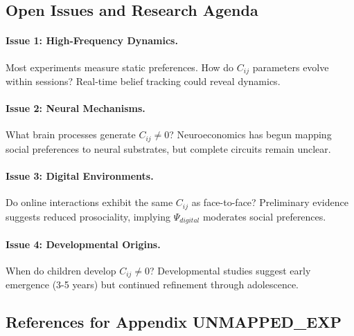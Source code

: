 
\subsection{Open Issues and Research Agenda}
\label{sec:EV-openissues}

\paragraph{Issue 1: High-Frequency Dynamics.}
Most experiments measure static preferences. How do $C_{ij}$ parameters
evolve within sessions? Real-time belief tracking could reveal dynamics.

\paragraph{Issue 2: Neural Mechanisms.}
What brain processes generate $C_{ij} \neq 0$? Neuroeconomics has begun
mapping social preferences to neural substrates, but complete circuits
remain unclear.

\paragraph{Issue 3: Digital Environments.}
Do online interactions exhibit the same $C_{ij}$ as face-to-face?
Preliminary evidence suggests reduced prosociality, implying $\Psi_{digital}$
moderates social preferences.

\paragraph{Issue 4: Developmental Origins.}
When do children develop $C_{ij} \neq 0$? Developmental studies suggest
early emergence (3-5 years) but continued refinement through adolescence.


\subsection{References for Appendix UNMAPPED_EXP}
\label{sec:EV-references}

